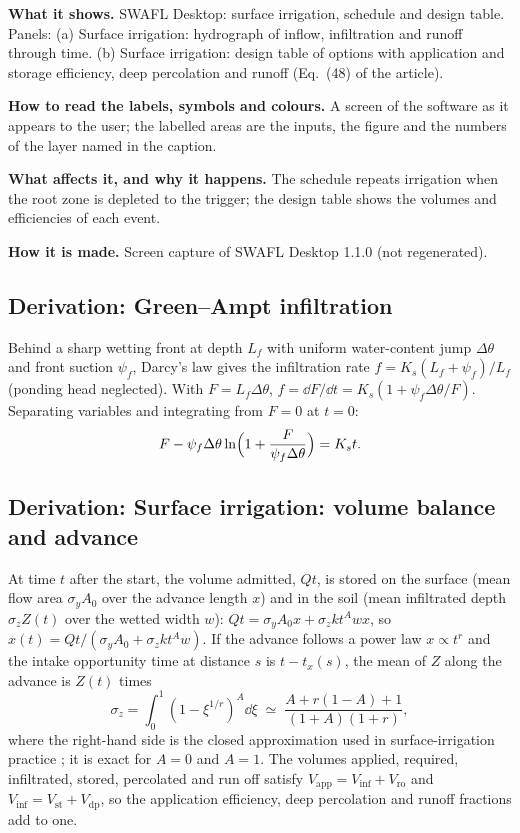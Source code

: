\textbf{What it shows.} SWAFL Desktop: surface irrigation, schedule and design table. Panels: (a) Surface irrigation: hydrograph of inflow, infiltration and runoff through time. (b) Surface irrigation: design table of options with application and storage efficiency, deep percolation and runoff (Eq.~(48) of the article).

\textbf{How to read the labels, symbols and colours.} A screen of the software as it appears to the user; the labelled areas are the inputs, the figure and the numbers of the layer named in the caption.

\textbf{What affects it, and why it happens.} The schedule repeats irrigation when the root zone is depleted to the trigger; the design table shows the volumes and efficiencies of each event. 

\textbf{How it is made.} Screen capture of SWAFL Desktop 1.1.0 (not regenerated).


\subsection{Derivation: Green--Ampt infiltration}\label{der:s2:9}
Behind a sharp wetting front at depth $L_f$ with uniform water-content jump $\Delta\theta$ and front suction $\psi_f$, Darcy's law gives the infiltration rate $f=K_s(L_f+\psi_f)/L_f$ (ponding head neglected). With $F=L_f\Delta\theta$, $f=\dd F/\dd t=K_s(1+\psi_f\Delta\theta/F)$. Separating variables and integrating from $F=0$ at $t=0$:
\begin{equation}F-\psi_f\Delta\theta\ln\Bigl(1+\frac{F}{\psi_f\Delta\theta}\Bigr)=K_st.\end{equation}


\subsection{Derivation: Surface irrigation: volume balance and advance}\label{der:s2:10}
At time $t$ after the start, the volume admitted, $Qt$, is stored on the surface (mean flow area $\sigma_yA_0$ over the advance length $x$) and in the soil (mean infiltrated depth $\sigma_zZ(t)$ over the wetted width $w$): $Qt=\sigma_yA_0x+\sigma_zkt^{A}wx$, so $x(t)=Qt/(\sigma_yA_0+\sigma_zkt^{A}w)$. If the advance follows a power law $x\propto t^{r}$ and the intake opportunity time at distance $s$ is $t-t_x(s)$, the mean of $Z$ along the advance is $Z(t)$ times
\begin{equation}\sigma_z=\int_0^1(1-\xi^{1/r})^{A}\dd\xi\;\simeq\;\frac{A+r(1-A)+1}{(1+A)(1+r)},\end{equation}where the right-hand side is the closed approximation used in surface-irrigation practice \citep{Walker1987}; it is exact for $A=0$ and $A=1$.
The volumes applied, required, infiltrated, stored, percolated and run off satisfy $V_{\mathrm{app}}=V_{\mathrm{inf}}+V_{\mathrm{ro}}$ and $V_{\mathrm{inf}}=V_{\mathrm{st}}+V_{\mathrm{dp}}$, so the application efficiency, deep percolation and runoff fractions add to one.


